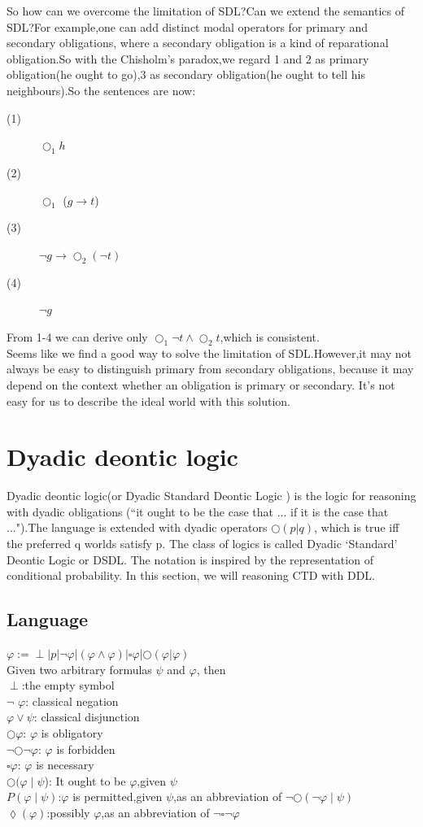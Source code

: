 \documentclass{article}
\begin{document}
So how can we overcome the limitation of SDL?Can we extend the semantics of SDL?For example,one can add distinct modal operators for primary and secondary obligations, where a secondary obligation is a kind of reparational obligation.So with the Chisholm’s paradox,we regard 1 and 2 as primary obligation(he ought to go),3 as secondary obligation(he ought to tell his neighbours).So the sentences are now:
\begin{description}
\item[(1)] $\bigcirc_{1} h$
\item[(2)]$\bigcirc_{1}$ ($g \to t $)
\item[(3)]$\neg g \to \bigcirc_ {2} (\neg t)$
\item[(4)]$\neg g$
\end{description}
From 1-4 we can derive only $\bigcirc_{1} \neg t \wedge \bigcirc_{2} t$,which is consistent.\\
Seems like we find a good way to solve the limitation of SDL.However,it may not always be easy to distinguish primary from secondary obligations, because it may depend on the context whether an obligation is primary or secondary. It's not easy for us to describe the ideal world with this solution. 
\section{Dyadic deontic logic}
Dyadic deontic logic(or Dyadic Standard Deontic Logic ) is the logic for reasoning with dyadic obligations (“it ought to be the case that ... if it is the case that ...").The language is extended with dyadic operators 
 $\bigcirc(p|q)$, which is true iff the preferred q worlds satisfy p. The class of logics is called Dyadic ‘Standard’ Deontic Logic or DSDL. The notation is inspired by the representation of conditional probability.
In this section, we will reasoning CTD with DDL.
\subsection{Language}
$\varphi := \perp | p | \neg \varphi |(\varphi \wedge \varphi)|\square \varphi |\bigcirc(\varphi|\varphi)$\\
Given two arbitrary formulas $\psi$  and $\varphi$, then\\
$\perp$:the empty symbol\\
$\neg$ $\varphi$: classical negation\\
$\varphi \vee  \psi $: classical disjunction\\
$\bigcirc \varphi $: $\varphi$ is obligatory\\
$ \neg \bigcirc\neg\varphi$: $ \varphi$ is forbidden\\
$ \square\varphi$: $\varphi$ is necessary\\
$\bigcirc(\varphi\mid\psi$): It ought to be $\varphi$,given $\psi$\\
$P(\varphi\mid\psi) $:$\varphi$ is permitted,given $\psi$,as an abbreviation of $\neg\bigcirc(\neg\varphi\mid\psi)$\\
$\lozenge(\varphi)$:possibly $\varphi$,as an abbreviation of $\neg\square\neg\varphi$\\
\end{document}
